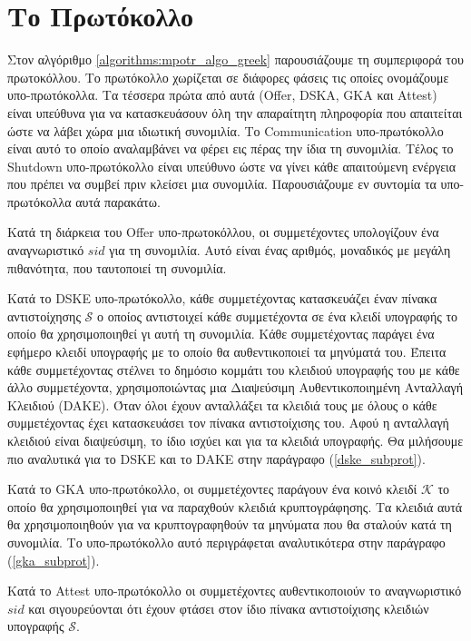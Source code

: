 \section{Το Πρωτόκολλο}

Στον αλγόριθμο \ref{algorithms:mpotr_algo_greek} παρουσιάζουμε τη συμπεριφορά του πρωτοκόλλου.
Το πρωτόκολλο χωρίζεται σε διάφορες φάσεις τις οποίες ονομάζουμε υπο-πρωτόκολλα.
Τα τέσσερα πρώτα από αυτά (Offer, DSKA, GKA και Attest) είναι υπεύθυνα για να κατασκευάσουν όλη την απαραίτητη πληροφορία που απαιτείται ώστε να λάβει χώρα μια ιδιωτική συνομιλία.
Το Communication υπο-πρωτόκολλο είναι αυτό το οποίο αναλαμβάνει να φέρει εις πέρας την ίδια τη συνομιλία.
Τέλος το Shutdown υπο-πρωτόκολλο είναι υπεύθυνο ώστε να γίνει κάθε απαιτούμενη ενέργεια που πρέπει να συμβεί πριν κλείσει μια συνομιλία.
Παρουσιάζουμε εν συντομία τα υπο-πρωτόκολλα αυτά παρακάτω.

Κατά τη διάρκεια του Offer υπο-πρωτοκόλλου, οι συμμετέχοντες υπολογίζουν ένα αναγνωριστικό $sid$ για τη συνομιλία.
Αυτό είναι ένας αριθμός, μοναδικός με μεγάλη πιθανότητα, που ταυτοποιεί τη συνομιλία.

Κατά το DSKE υπο-πρωτόκολλο, κάθε συμμετέχοντας κατασκευάζει έναν πίνακα αντιστοίχησης $\mathcal{S}$ ο οποίος αντιστοιχεί κάθε συμμετέχοντα σε ένα κλειδί υπογραφής το οποίο θα χρησιμοποιηθεί γι αυτή τη συνομιλία.
Κάθε συμμετέχοντας παράγει ένα εφήμερο κλειδί υπογραφής με το οποίο θα αυθεντικοποιεί τα μηνύματά του.
Έπειτα κάθε συμμετέχοντας στέλνει το δημόσιο κομμάτι του κλειδιού υπογραφής του με κάθε άλλο συμμετέχοντα, χρησιμοποιώντας μια Διαψεύσιμη Αυθεντικοποιημένη Ανταλλαγή Κλειδιού (DAKE).
Όταν όλοι έχουν ανταλλάξει τα κλειδιά τους με όλους ο κάθε συμμετέχοντας έχει κατασκευάσει τον πίνακα αντιστοίχισης του.
Αφού η ανταλλαγή κλειδιού είναι διαψεύσιμη, το ίδιο ισχύει και για τα κλειδιά υπογραφής.
Θα μιλήσουμε πιο αναλυτικά για το DSKE και το DAKE στην παράγραφο (\ref{dske_subprot}).

Κατά το GKA υπο-πρωτόκολλο, οι συμμετέχοντες παράγουν ένα κοινό κλειδί $\mathcal{K}$ το οποίο θα χρησιμοποιηθεί για να παραχθούν κλειδιά κρυπτογράφησης.
Τα κλειδιά αυτά θα χρησιμοποιηθούν για να κρυπτογραφηθούν τα μηνύματα που θα σταλούν κατά τη συνομιλία.
Το υπο-πρωτόκολλο αυτό περιγράφεται αναλυτικότερα στην παράγραφο (\ref{gka_subprot}).

Κατά το Attest υπο-πρωτόκολλο οι συμμετέχοντες αυθεντικοποιούν το αναγνωριστικό $sid$ και σιγουρεύονται ότι έχουν φτάσει στον ίδιο πίνακα αντιστοίχισης κλειδιών υπογραφής $\mathcal{S}$.

